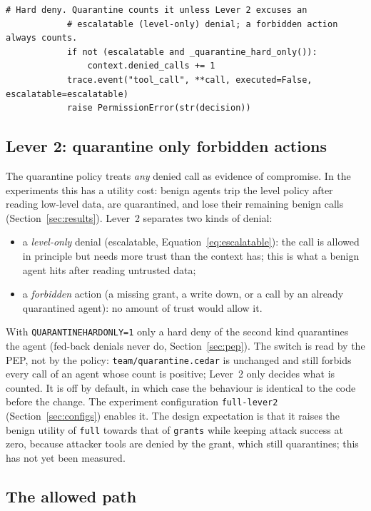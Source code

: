 \documentclass[11pt,a4paper]{article}
\DeclareRobustCommand{\code}[1]{{\renewcommand{\_}{\textunderscore\allowbreak}\texttt{#1}}}
\begin{document}
\begin{lstlisting}[firstnumber=68,style=py,caption={PEP: escalation, feedback and hard deny (\texttt{security/authorization\_middleware.py}, lines 68--118)},label={lst:pep2}]
            # Hard deny. Quarantine counts it unless Lever 2 excuses an
            # escalatable (level-only) denial; a forbidden action always counts.
            if not (escalatable and _quarantine_hard_only()):
                context.denied_calls += 1
            trace.event("tool_call", **call, executed=False, escalatable=escalatable)
            raise PermissionError(str(decision))
\end{lstlisting}

\subsection{Lever 2: quarantine only forbidden actions}
\label{sec:lever2}

The quarantine policy treats \emph{any} denied call as evidence of compromise. In the
experiments this has a utility cost: benign agents trip the level policy after reading
low-level data, are quarantined, and lose their remaining benign calls
(Section~\ref{sec:results}). Lever~2 separates two kinds of denial:
\begin{itemize}
  \item a \emph{level-only} denial (escalatable, Equation~\eqref{eq:escalatable}): the
        call is allowed in principle but needs more trust than the context has; this is
        what a benign agent hits after reading untrusted data;
  \item a \emph{forbidden} action (a missing grant, a write down, or a call by an already
        quarantined agent): no amount of trust would allow it.
\end{itemize}
With \code{QUARANTINE\_HARD\_ONLY=1} only a hard deny of the second kind quarantines
the agent (fed-back denials never do, Section~\ref{sec:pep}). The switch is read by the
PEP, not by the policy: \code{team/quarantine.cedar} is unchanged
and still forbids every call of an agent whose count is positive; Lever~2 only decides
what is counted. It is off by default, in which case the behaviour is identical to the
code before the change. The experiment configuration \code{full-lever2}
(Section~\ref{sec:configs}) enables it. The design expectation is that it raises the
benign utility of \code{full} towards that of \code{grants} while keeping attack success
at zero, because attacker tools are denied by the grant, which still quarantines; this has
not yet been measured.

\subsection{The allowed path}
\end{document}

